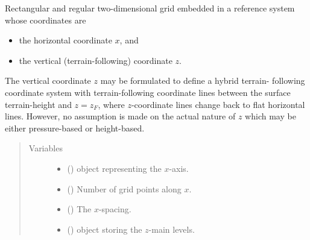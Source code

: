 \documentclass[letterpaper,10pt,english]{sphinxmanual}
\begin{document}
\begin{fulllineitems}
\label{\detokenize{api:grids.xz_grid.XZGrid}}
Rectangular and regular two-dimensional grid embedded in a reference system whose
coordinates are
\begin{itemize}
\item {} 
the horizontal coordinate \(x\), and

\item {} 
the vertical (terrain-following) coordinate \(z\).

\end{itemize}

The vertical coordinate \(z\) may be formulated to define a hybrid terrain-
following coordinate system with terrain-following coordinate lines between the
surface terrain-height and \(z = z_F\), where \(z\)-coordinate lines change
back to flat horizontal lines. However, no assumption is made on the actual nature
of \(z\) which may be either pressure-based or height-based.
\begin{quote}\begin{description}
\item[{Variables}] \leavevmode\begin{itemize}
\item {} 
{\hyperref[\detokenize{api:grids.xyz_grid.XYZGrid.x}]{}} () \textendash{} {\hyperref[\detokenize{api:grids.axis.Axis}]{}} object representing the \(x\)-axis.

\item {} 
{\hyperref[\detokenize{api:grids.xyz_grid.XYZGrid.nx}]{}} () \textendash{} Number of grid points along \(x\).

\item {} 
{\hyperref[\detokenize{api:grids.xyz_grid.XYZGrid.dx}]{}} () \textendash{} The \(x\)-spacing.

\item {} 
 () \textendash{} {\hyperref[\detokenize{api:grids.axis.Axis}]{}} object storing the \(z\)-main levels.


\end{itemize}
\end{description}
\end{quote}
\end{fulllineitems}
\end{document}

